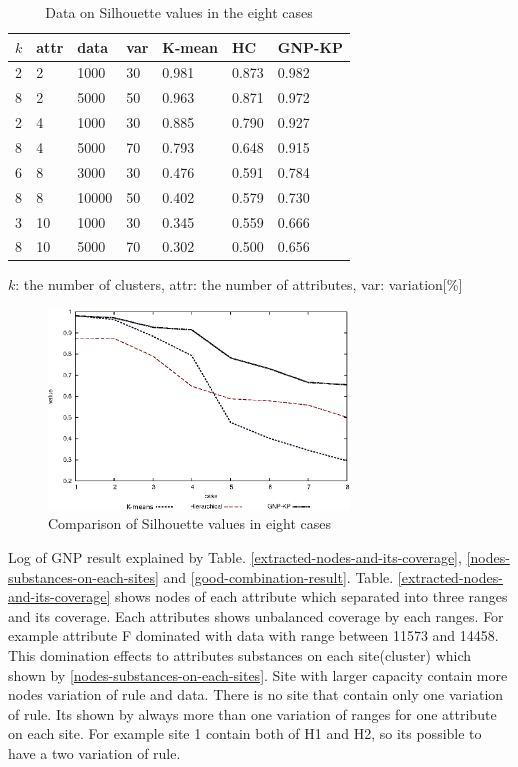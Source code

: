 \documentclass[fleqn,10pt,twocolumn]{SICE14}
\begin{document}
\begin{table}[tb]
\caption{Data on Silhouette values in the eight cases}
\label{silhouette-comparison}
\begin{tabular}{|l|l|l|l|l|l|l|}
\hline 
$k$ & attr & data & var & K-mean & HC & GNP-KP\tabularnewline
\hline 
2 & 2 & 1000 & 30 & 0.981 & 0.873 & 0.982\tabularnewline
\hline 
8 & 2 & 5000 & 50 & 0.963 & 0.871 & 0.972\tabularnewline
\hline 
2 & 4 & 1000 & 30 & 0.885 & 0.790 & 0.927\tabularnewline
\hline 
8 & 4 & 5000 & 70 & 0.793 & 0.648 & 0.915\tabularnewline
\hline 
6 & 8 & 3000 & 30 & 0.476 & 0.591 & 0.784\tabularnewline
\hline 
8 & 8 & 10000 & 50 & 0.402 & 0.579 & 0.730\tabularnewline
\hline 
3 & 10 & 1000 & 30 & 0.345 & 0.559 & 0.666\tabularnewline
\hline 
8 & 10 & 5000 & 70 & 0.302 & 0.500 & 0.656\tabularnewline
\hline 
\end{tabular}
$k$: the number of clusters, attr: the number of attributes, var: variation[\%]
\vspace{1em}
\end{table}

\begin{figure}
\includegraphics[width=8cm]{silhoutte}
\caption{\label{silhouette2014-02-13-11-45-04} Comparison of Silhouette values in eight cases}
\end{figure}

Log of GNP result explained by Table. \ref{extracted-nodes-and-its-coverage}, \ref{nodes-substances-on-each-sites} and \ref{good-combination-result}. Table. \ref{extracted-nodes-and-its-coverage} shows nodes of each attribute which separated into three ranges and its coverage. Each attributes shows unbalanced coverage by each ranges. For example attribute F dominated with data with range between 11573 and 14458. This domination effects to attributes substances on each site(cluster) which shown by \ref{nodes-substances-on-each-sites}. Site with larger capacity contain more nodes variation of rule and data. There is no site that contain only one variation of rule. Its shown by always more than one variation of ranges for one attribute on each site. For example site 1 contain both of H1 and H2, so its possible to have a two variation of rule.
\end{document}
